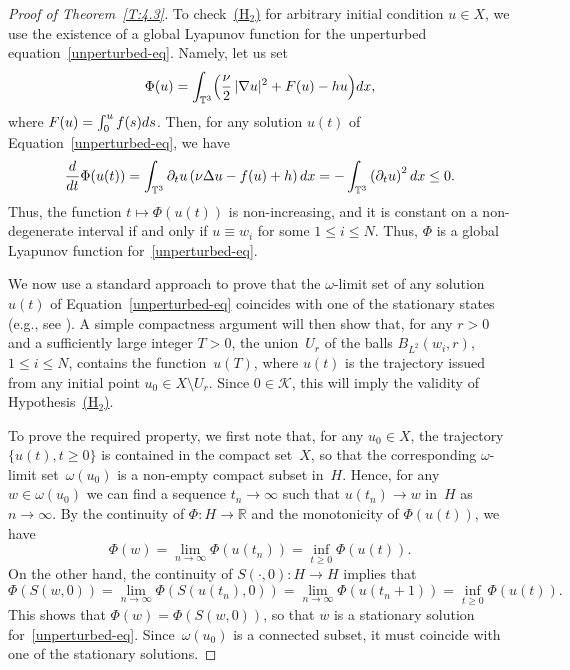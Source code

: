 \documentclass[11pt]{article}
\newcommand{\eg}{e.g.,\xspace}
\theoremstyle{plain}
\theoremstyle{definition}
\let\mathcal\mathscr
\theoremstyle{plain}
\numberwithin{equation}{section}
\let\p\partial
\let\ty\infty
\newcommand{\dd}{{\textup d}}
\newcommand{\R}{{\mathbb R}}
\newcommand{\T}{{\mathbb T}}
\newcommand{\KK}{{\mathcal K}}
\begin{document}
\begin{proof}[Proof of Theorem~\ref{T:4.3}]
To check~\hyperlink{H2}{(H$_2$)} for arbitrary initial condition $u\in X$, we use the existence of a global Lyapunov function for the unperturbed equation~\eqref{unperturbed-eq}. Namely, let us set
\begin{equation}\label{E:4.5}
\Phi(u)=\int_{\T^3} \Bigl(\frac\nu2\,|\nabla u|^2+F(u)-hu\Bigr)\dd x,
\end{equation}
where $F(u)=\int_0^uf(s)\dd s$. Then, for any solution $u(t)$ of Equation~\eqref{unperturbed-eq}, we have
\[
\frac{\dd}{\dd t} \Phi(u(t))=\int_{\T^3} \p_tu\left(\nu \Delta u- f(u)+h \right)\dd x=-\int_{\T^3} \left(\p_tu\right)^2\dd x\le 0.
\]
Thus, the function $t\mapsto \Phi(u(t))$ is non-increasing, and it is constant on a non-degenerate interval if and only if $u\equiv w_i$ for some $1\le i\le N$. Thus, $\varPhi$ is a global Lyapunov function for~\eqref{unperturbed-eq}.

We now use a standard approach to prove that the $\omega$-limit set of any solution~$u(t)$ of Equation~\eqref{unperturbed-eq} coincides with one of the stationary states (\eg see \cite[Chap.\,3,\,\S2]{BV1992}). A simple compactness argument will then show that, for any $r>0$ and a sufficiently large integer $T>0$, the union~$U_r$ of the balls $B_{L^2}(w_i,r)$, $1\le i\le N$, contains the function~$u(T)$, where $u(t)$ is the trajectory issued from any initial point $u_0\in X\setminus U_r$. Since $0\in \KK$, this will imply the validity of Hypothesis~\hyperlink{H2}{(H$_2$)}.

To prove the required property, we first note that, for any $u_0\in X$, the trajectory $\{u(t), t\ge0\}$ is contained in the compact set~$X$, so that the corresponding $\omega$-limit set~$\omega(u_0)$ is a non-empty compact subset in~$H$. Hence, for any $w\in \omega(u_0)$ we can find a sequence $t_n\to \ty$ such that $u(t_n)\to w$ in~$H$ as $n\to\ty$. By the continuity of $\Phi: H\to \R$ and the monotonicity of $\Phi(u(t))$, we have
\[
\Phi(w)=\lim_{n\to \ty}\Phi(u(t_n))= \inf_{t\ge0} \Phi(u(t)).
\]
On the other hand, the continuity of $S(\cdot,0):H\to H$ implies that
\[
\Phi(S(w,0))=\lim_{n\to \ty}\Phi(S(u(t_n),0))=\lim_{n\to \ty}\Phi(u(t_n+1))=\inf_{t\ge0} \Phi(u(t)).
\]
This shows that $\Phi(w)=\Phi(S(w,0))$, so that $w$ is a stationary solution for~\eqref{unperturbed-eq}. Since~$\omega(u_0)$ is a connected subset, it must coincide with one of the stationary solutions.


\end{proof}
\end{document}
